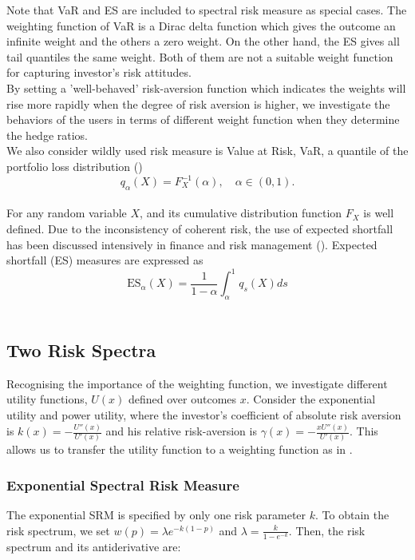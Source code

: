 \documentclass[11pt,a4paper,english]{article}
\begin{document}
\noindent Note that VaR and ES are included to spectral risk measure as special cases. The weighting function of VaR is a Dirac delta function which gives the outcome an infinite weight and the others a zero weight. On the other hand, the ES gives all tail quantiles the same weight. Both of them are not a suitable weight function for capturing investor's risk attitudes. \\

By setting a 'well-behaved' risk-aversion function which indicates the weights will rise more rapidly when the degree of risk aversion is higher, we investigate the behaviors of the users in terms of different weight function when they determine the hedge ratios. \\

We also consider wildly used risk measure is Value at Risk, VaR, a quantile of the portfolio loss distribution ({\color{blue}\citealp{jurgen2011statistics}})
\begin{equation}\label{eq:VaR}
q_{\alpha}(X) = F^{-1}_{X}(\alpha), \quad \alpha \in (0,1).
\end{equation}\\
For any random variable $X$, and its cumulative distribution function $F_X$ is well defined.
Due to the inconsistency of coherent risk, the use of expected shortfall has been discussed intensively in finance and risk management ({\color{blue}\citealp{jurgen2011statistics}}). Expected shortfall (ES) measures are expressed as
\begin{equation}\label{eq:ES}
\mbox{ES}_{\alpha}(X) = \frac{1}{1-\alpha}\int^1_{\alpha}q_{s}(X)ds
\end{equation}\\

\subsection{Two Risk Spectra}
Recognising the importance of the weighting function, we investigate different utility functions, $U(x)$ defined over outcomes $x$. Consider the exponential utility and power utility, where the investor's coefficient of absolute risk aversion is $k(x)= -\frac{U''(x)}{U'(x)} $ and his relative risk-aversion is $\gamma(x)=-\frac{xU''(x)}{U'(x)}$. This allows us to transfer the utility function to a weighting function as in {\color{blue}\citet{dowd2008spectral}}.

\subsubsection{Exponential Spectral Risk Measure}
  The exponential SRM is specified by only one risk parameter $k$. To obtain the risk spectrum, we set $ w(p)= \lambda e^{-k(1-p)}$ and $\lambda = \frac{k}{1-e^{-k}}$. Then, the risk spectrum and its antiderivative are: 
\end{document}
